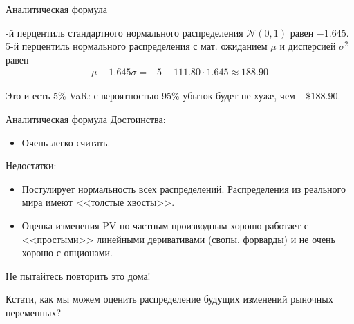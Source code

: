 \documentclass{beamer}
\begin{document}
\begin{frame}{Аналитическая формула}
\centering
{}

-й перцентиль стандартного нормального распределения $\mathcal{N}(0, 1)$ равен $-1.645$. 5-й перцентиль нормального распределения с мат. ожиданием $\mu$ и дисперсией $\sigma^2$ равен
\begin{align*}
\mu - 1.645\sigma = -5 - 111.80\cdot 1.645 \approx 188.90
\end{align*}

\justify
Это и есть 5\% VaR: с вероятностью 95\% убыток будет не хуже, чем $-\$188.90$.
\end{frame}



\begin{frame}{Аналитическая формула}
\justify
Достоинства:
\begin{itemize}
\justifying
\item Очень легко считать.
\end{itemize}

\justify
Недостатки:
\begin{itemize}
\justifying
\item Постулирует нормальность всех распределений. Распределения из реального мира имеют <<толстые хвосты>>.
\item Оценка изменения PV по частным производным хорошо работает с <<простыми>> линейными деривативами (свопы, форварды) и не очень хорошо с опционами.
\end{itemize}

\justify
Не пытайтесь повторить это дома!

\justify
Кстати, как мы можем оценить распределение \alert{будущих} изменений рыночных переменных?
\end{frame}
\end{document}
